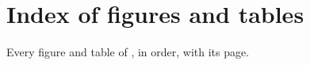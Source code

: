 \section{Index of figures and tables}\label{sec:index}
Every figure and table of \thissupp{}, in order, with its page.
\begingroup
\renewcommand{\listfigurename}{Figures}\renewcommand{\listtablename}{Tables}
\let\clearpage\relax
\small
\renewcommand{\section}[2]{\subsection*{#2}}
\listoffigures
\listoftables
\endgroup
